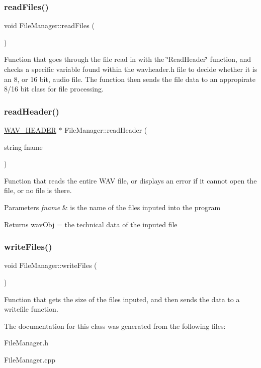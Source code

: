 \subsubsection{\texorpdfstring{read\+Files()}{readFiles()}}
{\footnotesize\ttfamily void File\+Manager\+::read\+Files (\begin{DoxyParamCaption}{ }\end{DoxyParamCaption})}

Function that goes through the file read in with the \char`\"{}\+Read\+Header\char`\"{} function, and checks a specific variable found within the wavheader.\+h file to decide whether it is an 8, or 16 bit, audio file. The function then sends the file data to an appropirate 8/16 bit class for file processing. \mbox{\label{classFileManager_a2db2e663db1df9cc19983f1bc642cf3a}} 
\subsubsection{\texorpdfstring{read\+Header()}{readHeader()}}
{\footnotesize\ttfamily \hyperlink{structWAV__HEADER}{W\+A\+V\+\_\+\+H\+E\+A\+D\+ER} $\ast$ File\+Manager\+::read\+Header (\begin{DoxyParamCaption}\item[{string}]{fname }\end{DoxyParamCaption})}

Function that reads the entire W\+AV file, or displays an error if it cannot open the file, or no file is there. 
\begin{DoxyParams}{Parameters}
{\em fname} & is the name of the files inputed into the program \\
\hline
\end{DoxyParams}
\begin{DoxyReturn}{Returns}
wav\+Obj = the technical data of the inputed file 
\end{DoxyReturn}
\mbox{\label{classFileManager_a8c9d83a8d5e00e0f33e9c7bc64ab7c15}} 
\subsubsection{\texorpdfstring{write\+Files()}{writeFiles()}}
{\footnotesize\ttfamily void File\+Manager\+::write\+Files (\begin{DoxyParamCaption}{ }\end{DoxyParamCaption})}

Function that gets the size of the files inputed, and then sends the data to a writefile function. 

The documentation for this class was generated from the following files\+:\begin{DoxyCompactItemize}
\item 
File\+Manager.\+h\item 
File\+Manager.\+cpp\end{DoxyCompactItemize}
